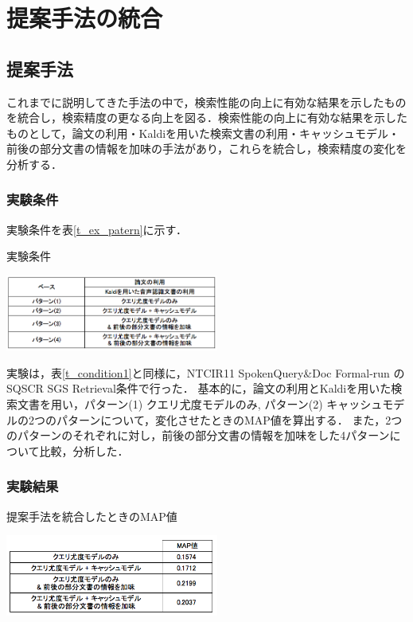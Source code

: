 \chapter{提案手法の統合}

\section{提案手法}

これまでに説明してきた手法の中で，検索性能の向上に有効な結果を示したものを統合し，検索精度の更なる向上を図る．検索性能の向上に有効な結果を示したものとして，論文の利用・Kaldiを用いた検索文書の利用・キャッシュモデル・前後の部分文書の情報を加味の手法があり，これらを統合し，検索精度の変化を分析する．

\subsection{実験条件}
実験条件を表\ref{t_ex_patern}に示す．

\begin{table}[h]
    \centering
    \caption{実験条件}
    \includegraphics[width=7cm]{./image/t_ex_patern.png}
    \label{t_ex_patern}
\end{table}
実験は，表\ref{t_condition1}と同様に，NTCIR11 SpokenQuery\&Doc Formal-run の SQSCR SGS Retrieval条件で行った．
基本的に，論文の利用とKaldiを用いた検索文書を用い，パターン(1) クエリ尤度モデルのみ, パターン(2) キャッシュモデルの2つのパターンについて，変化させたときのMAP値を算出する．
また，2つのパターンのそれぞれに対し，前後の部分文書の情報を加味をした4パターンについて比較，分析した．



\subsection{実験結果}

\begin{table}[htbp]
    \centering
    \caption{提案手法を統合したときのMAP値}
    \includegraphics[width=7cm]{./image/t_integration.png}
    \label{t_integration}
\end{table}

